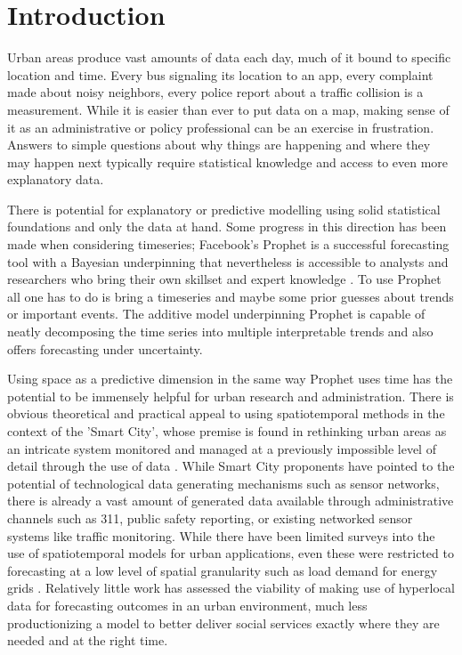 \chapter{Introduction}
\label{introduction}

Urban areas produce vast amounts of data each day, much of it bound to specific location and time. Every bus signaling its location to an app, every complaint made about noisy neighbors, every police report about a traffic collision is a measurement. While it is easier than ever to put data on a map, making sense of it as an administrative or policy professional can be an exercise in frustration. Answers to simple questions about why things are happening and where they may happen next typically require statistical knowledge and access to even more explanatory data. \par

There is potential for explanatory or predictive modelling using solid statistical foundations and only the data at hand. Some progress in this direction has been made when considering timeseries; Facebook's Prophet is a successful forecasting tool with a Bayesian underpinning that nevertheless is accessible to analysts and researchers who bring their own skillset and expert knowledge \cite{prophet}. To use Prophet all one has to do is bring a timeseries and maybe some prior guesses about trends or important events. The additive model underpinning Prophet is capable of neatly decomposing the time series into multiple interpretable trends and also offers forecasting under uncertainty. \par

Using space as a predictive dimension in the same way Prophet uses time has the potential to be immensely helpful for urban research and administration. There is obvious theoretical and practical appeal to using spatiotemporal methods in the context of the 'Smart City', whose premise is found in rethinking urban areas as an intricate system monitored and managed at a previously impossible level of detail through the use of data \cite{kitchin_2014}. While Smart City proponents have pointed to the potential of technological data generating mechanisms such as sensor networks, there is already a vast amount of generated data available through administrative channels such as 311, public safety reporting, or existing networked sensor systems like traffic monitoring. While there have been limited surveys into the use of spatiotemporal models for urban applications, even these were restricted to forecasting at a low level of spatial granularity such as load demand for energy grids \cite{tascikaraoglu_2017}. Relatively little work has assessed the viability of making use of hyperlocal data for forecasting outcomes in an urban environment, much less productionizing a model to better deliver social services exactly where they are needed and at the right time.
